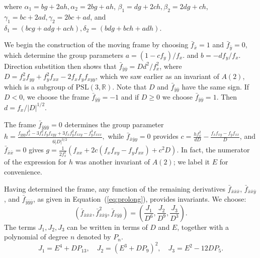 \documentclass[review,onefignum,onetabnum]{siamonline190516}
\def\R{\mathbb{R}}
\begin{document}
\noindent where $\alpha_1 = b g + 2 a h, \alpha_2 = 2 b g + a h$, $\beta_1 = d g + 2 c h, \beta_2 = 2 d g + c h$, $\gamma_1 = b c + 2 a d, \gamma_2= 2 b c + a d$, and $\delta_1 = (b c g+a d g+a c h), \delta_2 = (b d g+b c h+a d h)$.

We begin the construction of the moving frame by choosing $\bar f_{\bar x}
= 1$ and $\bar f_{\bar y}=  0$, which determine the group parameters $a =
(1-c f_y)/f_x.$ and $b = -d f_y/f_x$. Direction substition then shows that
$\bar f_{\bar y \bar y} = D d^2 / f_x^2$, where $D = f_{x}^2 f_{yy} + f_y^2
f_{xx} - 2 f_x f_y f_{xyy}$, which we saw earlier as an invariant of
$A(2)$, which is a subgroup of $\mathrm{PSL}(3,\R)$. Note that $D$ and
$\bar f_{\bar y \bar y}$ have the same sign. If $D < 0$, we choose the
frame $\bar{f}_{\bar y \bar y} = -1$ and if $D \ge 0$ we choose $\bar
f_{\bar y \bar y} = 1$. Then $d = f_x/|D|^{1/2}.$

The frame $\bar f_{ \bar y \bar y \bar y} = 0$ determines the group
parameter $ h = \frac{f_{yyy}f_x^3 - 3 f_x^2 f_y f_{xyy} + 3 f_x f_y^2
f_{xxy} - f_y^3 f_{xxx}}{6|D|^{3/2}},$ while $\bar f_{ \bar x \bar y 
y}=0$ provides $ c = \frac{h f_x^2}{d D} - \frac{f_x f_{xy} - f_y
f_{xx}}{D}$, and $\bar f_{ \bar x \bar x}=0$ gives $ g = \frac{1}{2
f_x^2}(f_{xx} + 2 c ( f_x f_{xy} - f_y f_{xx} ) + c^2 D).$ In fact, the
numerator of the expression for $h$ was another invariant of $A(2)$; we
label it $E$ for convenience.


Having determined the frame, any function of the remaining derivatives $\bar f_{ \bar x \bar x \bar x}$, $\bar f_{ \bar x \bar x \bar y}$, and $\bar f_{ \bar y \bar y \bar y}$, as given in Equation~(\ref{eq:prolong}), provides invariants. We choose: 
\begin{equation*}
 (\bar f_{\bar x\bar x\bar x}, \bar f_{\bar x\bar x\bar y}^2, \bar f_{\bar
 x\bar y\bar
 y})=\left(\frac{J_1}{D^6},\frac{J_2}{D^9},\frac{J_3}{D^3}\right).
\end{equation*} 
The terms $J_1, J_2, J_3$ can be written in terms of $D$ and $E$, together
with a polynomial of degree $n$ denoted by $P_n$. 
\begin{equation*}
    J_1 = E^4 + D P_{13},\quad J_2 = (E^3 + D P_9)^2,\quad J_3=E^2 -12 D P_5.
\end{equation*}
\end{document}
